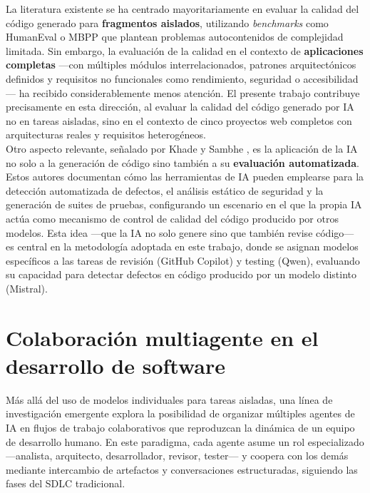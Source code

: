 La literatura existente se ha centrado mayoritariamente en evaluar la calidad del código generado para \textbf{fragmentos aislados}, utilizando \textit{benchmarks} como HumanEval o MBPP que plantean problemas autocontenidos de complejidad limitada. Sin embargo, la evaluación de la calidad en el contexto de \textbf{aplicaciones completas} ---con múltiples módulos interrelacionados, patrones arquitectónicos definidos y requisitos no funcionales como rendimiento, seguridad o accesibilidad--- ha recibido considerablemente menos atención. El presente trabajo contribuye precisamente en esta dirección, al evaluar la calidad del código generado por \ac{IA} no en tareas aisladas, sino en el contexto de cinco proyectos web completos con arquitecturas reales y requisitos heterogéneos.\\

Otro aspecto relevante, señalado por Khade y Sambhe \cite{Khade:2025:AIinSD}, es la aplicación de la \ac{IA} no solo a la generación de código sino también a su \textbf{evaluación automatizada}. Estos autores documentan cómo las herramientas de \ac{IA} pueden emplearse para la detección automatizada de defectos, el análisis estático de seguridad y la generación de suites de pruebas, configurando un escenario en el que la propia \ac{IA} actúa como mecanismo de control de calidad del código producido por otros modelos. Esta idea ---que la \ac{IA} no solo genere sino que también revise código--- es central en la metodología adoptada en este trabajo, donde se asignan modelos específicos a las tareas de revisión (GitHub Copilot) y testing (Qwen), evaluando su capacidad para detectar defectos en código producido por un modelo distinto (Mistral).\\

\section{Colaboración multiagente en el desarrollo de software} \label{sec:colaboracion-multiagente}

Más allá del uso de modelos individuales para tareas aisladas, una línea de investigación emergente explora la posibilidad de organizar múltiples agentes de \ac{IA} en flujos de trabajo colaborativos que reproduzcan la dinámica de un equipo de desarrollo humano. En este paradigma, cada agente asume un rol especializado ---analista, arquitecto, desarrollador, revisor, tester--- y coopera con los demás mediante intercambio de artefactos y conversaciones estructuradas, siguiendo las fases del \ac{SDLC} tradicional.\\

